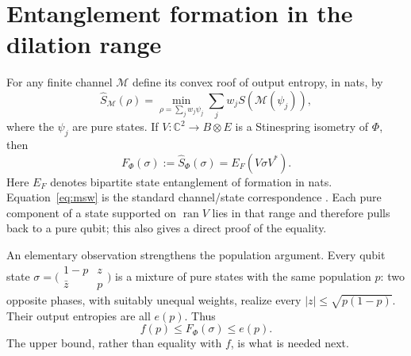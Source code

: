 \documentclass[11pt]{article}
\begin{document}
\section{Entanglement formation in the dilation range}\label{sec:formation}
For any finite channel $\mathcal M$ define its convex roof of output entropy,
in nats, by
\[
 \widehat S_{\mathcal M}(\rho)=
 \min_{\rho=\sum_jw_j\psi_j}\sum_jw_j S(\mathcal M(\psi_j)),
\]
where the $\psi_j$ are pure states. If $V:\mathbb C^2\to B\otimes E$
is a Stinespring isometry of $\Phi$, then
\begin{equation}\label{eq:msw}
 F_\Phi(\sigma):=\widehat S_\Phi(\sigma)
       =E_F(V\sigma V^*) .
\end{equation}
Here $E_F$ denotes bipartite state entanglement of formation in nats.
Equation~\eqref{eq:msw} is the standard channel/state correspondence
\cite{msw}. Each pure component of a state supported on $\operatorname{ran}V$
lies in that range and therefore pulls back to a pure qubit; this also gives
a direct proof of the equality.

An elementary observation strengthens the population argument. Every
qubit state $\sigma=\bigl(\begin{smallmatrix}1-p&z\\\bar z&p\end{smallmatrix}\bigr)$
is a mixture of pure states with the same population $p$: two opposite
phases, with suitably unequal weights, realize every $|z|\le\sqrt{p(1-p)}$.
Their output entropies are all $e(p)$. Thus
\begin{equation}\label{eq:roofupper}
 f(p)\le F_\Phi(\sigma)\le e(p).
\end{equation}
The upper bound, rather than equality with $f$, is what is needed next.
\end{document}
